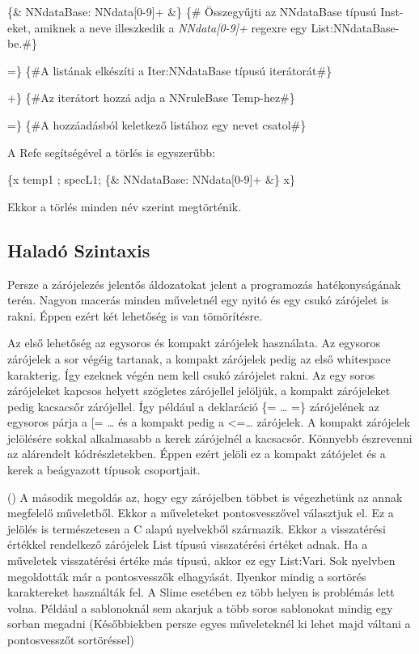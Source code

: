 {\{\& NNdataBase: NNdata[0-9]+ \&\} \{\# Összegyűjti az NNdataBase típusú Inst-eket, amiknek a neve illeszkedik a \textit{NNdata[0-9]+} regexre egy List:NNdataBase-be.\#\}

=\} \{\#A listának elkészíti a Iter:NNdataBase típusú iterátorát\#\}

+\} \{\#Az iterátort hozzá adja a NNruleBase Temp-hez\#\}

=\} \{\#A hozzáadásból keletkező listához egy nevet csatol\#\}

A Refe segítségével a törlés is egyszerűbb:

\{x temp1 ; specL1; \{\& NNdataBase: NNdata[0-9]+ \&\} x\}

Ekkor a törlés minden név szerint megtörténik.



\subsection{Haladó Szintaxis}
\label{sec:SAdvaSyntax}
Persze a zárójelezés jelentős áldozatokat jelent a programozás hatékonyságának terén. 
Nagyon macerás minden műveletnél egy nyitó és egy csukó zárójelet is rakni. 
Éppen ezért két lehetőség is van tömörítésre.

Az első lehetőség az egysoros és kompakt zárójelek használata. 
Az egysoros zárójelek a sor végéig tartanak, a kompakt zárójelek pedig az első whitespace karakterig. 
Így ezeknek végén nem kell csukó zárójelet rakni. 
Az egy soros zárójeleket kapcsos helyett szögletes zárójellel jelöljük, a kompakt zárójeleket pedig kacsacsőr zárójellel. 
Így például a deklaráció \{= … =\} zárójelének az egysoros párja a [= … és a kompakt pedig a <=… zárójelek.
A kompakt zárójelek jelölésére sokkal alkalmasabb a kerek zárójelnél a kacsacsőr.
Könnyebb észrevenni az alárendelt kódrészletekben.
Éppen ezért jelöli ez a kompakt zátójelet és a kerek a beágyazott típusok csoportjait.

()
A második megoldás az, hogy egy zárójelben többet is végezhetünk az annak megfelelő műveletből. 
Ekkor a műveleteket pontosvesszővel választjuk el.
Ez a jelölés is természetesen a C alapú nyelvekből származik.
Ekkor a visszatérési értékkel rendelkező zárójelek List típusú visszatérési értéket adnak.
Ha a műveletek visszatérési értéke más típusú, akkor ez egy List:Vari. 
Sok nyelvben megoldották már a pontosvesszők elhagyását.
Ilyenkor mindig a sortörés karaktereket használták fel.
A Slime  esetében ez több helyen is problémás lett volna.
Például a sablonoknál sem akarjuk a több soros sablonokat mindig egy sorban megadni
(Későbbiekben persze egyes műveleteknél ki lehet majd váltani a pontosvesszőt sortöréssel)

}
